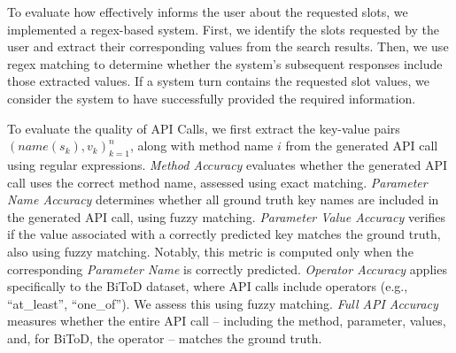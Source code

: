 To evaluate how effectively {\ours} informs the user about the requested slots, we implemented a regex-based system. First, we identify the slots requested by the user and extract their corresponding values from the search results. Then, we use regex matching to determine whether the system’s subsequent responses include those extracted values. If a system turn contains the requested slot values, we consider the system to have successfully provided the required information.


To evaluate the quality of API Calls, we first extract the key-value pairs $ (name(s_k),v_k)_{k=1}^n $, along with method name $i$ from the generated API call using regular expressions. \emph{Method Accuracy} evaluates whether the generated API call uses the correct method name, assessed using exact matching. \emph{Parameter Name Accuracy} determines whether all ground truth key names are included in the generated API call, using fuzzy matching. \emph{Parameter Value Accuracy} verifies if the value associated with a correctly predicted key matches the ground truth, also using fuzzy matching. Notably, this metric is computed only when the corresponding \emph{Parameter Name} is correctly predicted. \emph{Operator Accuracy} applies specifically to the BiToD dataset, where API calls include operators (e.g., ``at\_least'', ``one\_of''). We assess this using fuzzy matching. \emph{Full API Accuracy} measures whether the entire API call -- including the method, parameter, values, and, for BiToD, the operator -- matches the ground truth.



